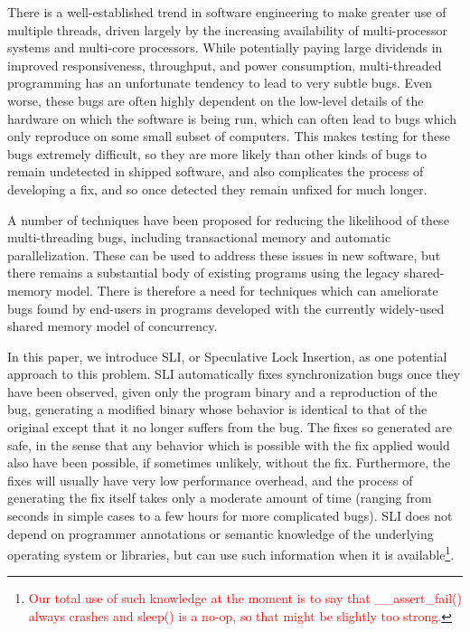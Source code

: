 \documentclass[10pt,twocolumn,preprint,natbib,authoryear]{sigplanconf}
\newcommand{\editorial}[1]{\textcolor{red}{\footnote{\textcolor{red}{#1}}}}
\begin{document}
There is a well-established trend in software engineering to make
greater use of multiple threads, driven largely by the increasing
availability of multi-processor systems and multi-core processors.
While potentially paying large dividends in improved responsiveness,
throughput, and power consumption, multi-threaded programming has an
unfortunate tendency to lead to very subtle bugs.  Even worse, these
bugs are often highly dependent on the low-level details of the
hardware on which the software is being run, which can often lead to
bugs which only reproduce on some small subset of computers.  This
makes testing for these bugs extremely difficult, so they are more
likely than other kinds of bugs to remain undetected in shipped
software, and also complicates the process of developing a fix, and so
once detected they remain unfixed for much longer.

A number of techniques have been proposed for reducing the likelihood
of these multi-threading bugs, including transactional
memory\cite{Shavit1997} and automatic parallelization\cite{Bacon1994}.
These can be used to address these issues in new software, but there
remains a substantial body of existing programs using the legacy
shared-memory model.  There is therefore a need for techniques which
can ameliorate bugs found by end-users in programs developed with the
currently widely-used shared memory model of concurrency.

In this paper, we introduce SLI, or Speculative Lock Insertion, as one
potential approach to this problem.  SLI automatically fixes
synchronization bugs once they have been observed, given only the
program binary and a reproduction of the bug, generating a modified
binary whose behavior is identical to that of the original except that
it no longer suffers from the bug.  The fixes so generated are safe,
in the sense that any behavior which is possible with the fix applied
would also have been possible, if sometimes unlikely, without the fix.
Furthermore, the fixes will usually have very low performance
overhead, and the process of generating the fix itself takes only a
moderate amount of time (ranging from seconds in simple cases to a few
hours for more complicated bugs).  SLI does not depend on programmer
annotations or semantic knowledge of the underlying operating system
or libraries, but can use such information when it is
available\editorial{Our total use of such knowledge at the moment is
  to say that \_\_assert\_fail() always crashes and sleep() is a
  no-op, so that might be slightly too strong.}.
\end{document}
